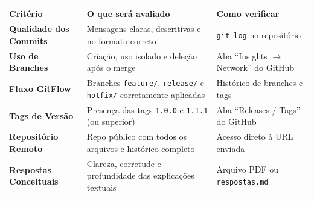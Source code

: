 \documentclass[12pt]{article}
\begin{document}
\vspace{0.4cm}

\begin{tcolorbox}[
  colback=gray!5,
  colframe=gray!50,
  arc=4pt,
  title={\textbf{Critérios de Avaliação (Rubrica)}},
  fonttitle=\bfseries
]
\renewcommand{\arraystretch}{1.4}
\begin{tabular}{>{\bfseries}p{4.5cm} p{5.5cm} p{4.5cm}}
\toprule
\textbf{Critério} & \textbf{O que será avaliado} & \textbf{Como verificar} \\
\midrule
Qualidade dos Commits & Mensagens claras, descritivas e no formato correto & \texttt{git log} no repositório \\
Uso de Branches & Criação, uso isolado e deleção após o merge & Aba ``Insights $\to$ Network'' do GitHub \\
Fluxo GitFlow & Branches \texttt{feature/}, \texttt{release/} e \texttt{hotfix/} corretamente aplicadas & Histórico de branches e tags \\
Tags de Versão & Presença das tags \texttt{1.0.0} e \texttt{1.1.1} (ou superior) & Aba ``Releases / Tags'' do GitHub \\
Repositório Remoto & Repo público com todos os arquivos e histórico completo & Acesso direto à URL enviada \\
Respostas Conceituais & Clareza, corretude e profundidade das explicações textuais & Arquivo PDF ou \texttt{respostas.md} \\
\bottomrule
\end{tabular}
\end{tcolorbox}

\vspace{0.6cm}

\begin{center}
\end{center}
\end{document}
